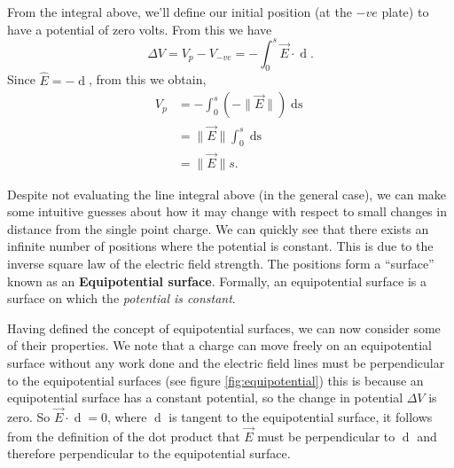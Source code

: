 From the integral above, we'll define our initial position (at the $-ve$ plate) to have a potential of zero volts. From this we have
\begin{equation}
    \Delta V = V_p - V_{-ve} = - \int_0^s  \vec{E} \cdot \mathop{\mathrm{d}\vec{s}}. 
\end{equation}
Since $\hat{E} = -\mathop{\mathrm{d}\hat{s}}$, from this we obtain, 
\begin{align}
    V_p &= - \int_0^s (- \| \vec{E} \| ) \mathop{\mathrm{d}s} \\
    &= \| \vec{E} \| \int_0^s \mathop{\mathrm{d}s} \\
    &= \| \vec{E} \| s.    
\end{align}

Despite not evaluating the line integral above (in the general case), we can make some intuitive guesses about how it may change with respect to small changes in distance from the single point charge. We can quickly see that there exists an infinite number of positions where the potential is constant. This is due to the inverse square law of the electric field strength. The positions form a ``surface'' known as an \textbf{Equipotential surface}. Formally, an equipotential surface is a surface on which the \textit{potential is constant}. 

Having defined the concept of equipotential surfaces, we can now consider some of their properties. We note that a charge can move freely on an equipotential surface without any work done and the electric field lines must be perpendicular to the equipotential surfaces (see figure \ref{fig:equipotential}) this is because an equipotential surface has a constant potential, so the change in potential $\Delta V$ is zero. So $\vec{E} \cdot \mathop{\mathrm{d}\vec{s}} = 0$, where $\mathop{\mathrm{d}\vec{s}}$ is tangent to the equipotential surface, it follows from the definition of the dot product that $\vec{E}$ must be perpendicular to $\mathop{\mathrm{d}\vec{s}}$ and therefore perpendicular to the equipotential surface.    

